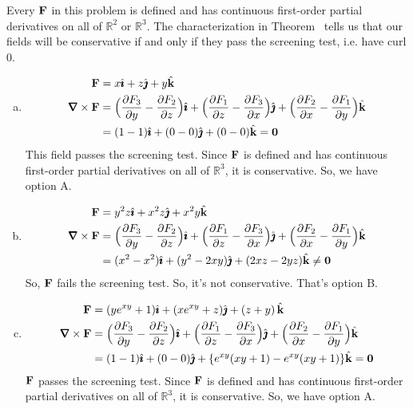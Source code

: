 \begin{solution}
Every $\mathbf{F}$ in this problem is defined and has continuous first-order partial derivatives on all of $\mathbb R^2$ or $\mathbb R^3$. The characterization in Theorem~ tells us that our fields will be conservative if and only if they pass the screening test, i.e. have curl 0.

\begin{enumerate}[a.]
\item \begin{align*}\vF&=x\hi + z\hj + y\hk\\
\vnabla \times \vF&=\Big(\frac{\partial F_3}{\partial y} -\frac{\partial F_2}{\partial z} \Big)\hi
+\Big(\frac{\partial F_1}{\partial z} -\frac{\partial F_3}{\partial x} \Big)\hj
+\Big(\frac{\partial F_2}{\partial x} -\frac{\partial F_1}{\partial y} \Big)\hk\\
&=(1-1)\hi+(0-0)\hj+(0-0)\hk = \mathbf0
\end{align*}
This field passes the screening test.  Since $\mathbf{F}$ is defined and has continuous first-order partial derivatives on all of $\mathbb R^3$, it is conservative. So, we have option A.

\item  \begin{align*}\vF&=y^2z\hi + x^2z\hj + x^2y\hk\\
\vnabla \times \vF&=\Big(\frac{\partial F_3}{\partial y} -\frac{\partial F_2}{\partial z} \Big)\hi
+\Big(\frac{\partial F_1}{\partial z} -\frac{\partial F_3}{\partial x} \Big)\hj
+\Big(\frac{\partial F_2}{\partial x} -\frac{\partial F_1}{\partial y} \Big)\hk\\
&=(x^2-x^2)\hi+(y^2-2xy)\hj+(2xz-2yz)\hk \neq \mathbf0
\end{align*}
So, $\mathbf{F}$ fails the screening test.  So, it's not conservative. That's option B.

\item 
 \begin{align*}\vF&=(ye^{xy}+1)\hi + (xe^{xy}+z)\hj + \left(z+y\right)\hk\\
\vnabla \times \vF&=\Big(\frac{\partial F_3}{\partial y} -\frac{\partial F_2}{\partial z} \Big)\hi
+\Big(\frac{\partial F_1}{\partial z} -\frac{\partial F_3}{\partial x} \Big)\hj
+\Big(\frac{\partial F_2}{\partial x} -\frac{\partial F_1}{\partial y} \Big)\hk\\
&=(1-1)\hi+(0-0)\hj+\{e^{xy}(xy+1)-e^{xy}(xy+1)\}\hk = \mathbf0
\end{align*}
$\mathbf{F}$ passes the screening test. Since $\mathbf{F}$ is defined and has continuous first-order partial derivatives on all of $\mathbb R^3$, it is conservative. So, we have option A.


\end{enumerate}
\end{solution}
